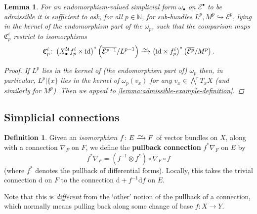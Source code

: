 \documentclass[11pt,fleqn]{article}
\theoremstyle{plain}
\newtheorem{lemma}[theorem]{Lemma}
\theoremstyle{definition}
\newtheorem{definition}[theorem]{Definition}
\theoremstyle{remark}
\numberwithin{equation}{theorem}
\newcommand{\cover}{\mathcal{U}}
\newcommand{\restricted}{\mathbin{\big\vert}}
\newcommand{\id}{\mathrm{id}}
\newcommand{\congto}{\xrightarrow{\raisebox{-.5ex}[0ex][0ex]{$\sim$}}}
\newcommand{\define}[1]{\textbf{#1}}
\newcommand{\nerve}[1]{X_{#1}^\cover}
\newcommand{\comparison}[1]{\mathfrak{C}_{#1}}
\renewcommand{\d}{\mathrm{d}}
\begin{document}
        \begin{lemma}\label{lemma:admissible-endomorphism-valued-form-criterion}
            For an endomorphism-valued simplicial form $\omega_\bullet$ on $\mathcal{E}^\bullet$ to be admissible it is sufficient to ask, for all $p\in\mathbb{N}$, for sub-bundles $L^p,M^p\hookrightarrow\overline{\mathcal{E}^p}$, lying in the kernel of the endomorphism part of the $\omega_p$, such that the comparison maps $\comparison{p}^i$ restrict to isomorphisms
            \[
                \comparison{p}^i\colon
                \left(\nerve{\bullet} f^i_p\times\id\right)^*\left(\overline{\mathcal{E}^{p-1}}/L^{p-1}\right)
                \congto
                \left(\id\times f_p^i\right)^*\left(\overline{\mathcal{E}^p}/M^p\right).
            \]
            \begin{proof}
                If $L^p$ lies in the kernel of (the endomorphism part of) $\omega_p$ then, in particular, $L^p\restricted \{x\}$ lies in the kernel of $\omega_p(v_x)$ for any $v_x\in\bigwedge^r T_x X$ (and similarly for $M^p$).
                Then we appeal to \cref{lemma:admissible-example-definition}.
            \end{proof}
        \end{lemma}


    \subsection{Simplicial connections}

        \begin{definition}
            Given an \emph{isomorphism} $f\colon E\congto F$ of vector bundles on $X$, along with a connection $\nabla_F$ on $F$, we define the \define{pullback connection} $f^*\nabla_F$ on $E$ by
            \[
                f^*\nabla_F = (f^{-1}\otimes f^*)\circ\nabla_F\circ f
            \]
            (where $f^*$ denotes the pullback of differential forms).
            Locally, this takes the trivial connection $\d$ on $F$ to the connection $\d+f^{-1}\d f$ on $E$.

            Note that this is \emph{different} from the `other' notion of the pullback of a connection, which normally means pulling back along some change of base $f\colon X\to Y$.
        \end{definition}
\end{document}

